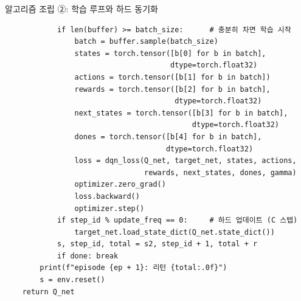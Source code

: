 \begin{frame}[fragile]{알고리즘 조립 ②: 학습 루프와 하드 동기화}
\begin{lstlisting}
            if len(buffer) >= batch_size:      # 충분히 차면 학습 시작
                batch = buffer.sample(batch_size)
                states = torch.tensor([b[0] for b in batch],
                                      dtype=torch.float32)
                actions = torch.tensor([b[1] for b in batch])
                rewards = torch.tensor([b[2] for b in batch],
                                       dtype=torch.float32)
                next_states = torch.tensor([b[3] for b in batch],
                                           dtype=torch.float32)
                dones = torch.tensor([b[4] for b in batch],
                                     dtype=torch.float32)
                loss = dqn_loss(Q_net, target_net, states, actions,
                                rewards, next_states, dones, gamma)
                optimizer.zero_grad()
                loss.backward()
                optimizer.step()
            if step_id % update_freq == 0:     # 하드 업데이트 (C 스텝)
                target_net.load_state_dict(Q_net.state_dict())
            s, step_id, total = s2, step_id + 1, total + r
            if done: break
        print(f"episode {ep + 1}: 리턴 {total:.0f}")
        s = env.reset()
    return Q_net
\end{lstlisting}
\end{frame}
